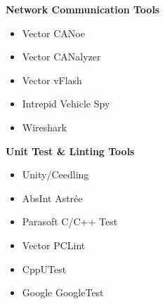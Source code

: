 \begin{minipage}[t]{0.48\textwidth}
\textbf{Network Communication Tools}
\begin{itemize}[leftmargin=*,noitemsep,topsep=0pt]
    \item Vector CANoe 
    \item Vector CANalyzer 
    \item Vector vFlash 
    \item Intrepid Vehicle Spy 
    \item Wireshark 
\end{itemize}

\vspace{0.5em}

\textbf{Unit Test \& Linting Tools}
\begin{itemize}[leftmargin=*,noitemsep,topsep=0pt]
    \item Unity/Ceedling 
    \item AbsInt Astrée 
    \item Parasoft C/C++ Test 
    \item Vector PCLint 
    \item CppUTest 
    \item Google GoogleTest 
\end{itemize}
\end{minipage}